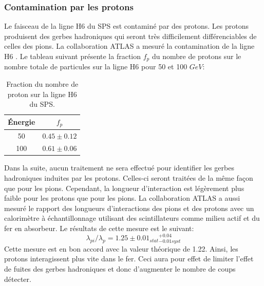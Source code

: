 \subsubsection{Contamination par les protons}
Le faisceau de la ligne H6 du SPS est contaminé par des protons. Les protons produisent des gerbes hadroniques qui seront très difficilement différenciables de celles des pions. La collaboration ATLAS a mesuré la contamination de la ligne H6 \cite{Abat}. Le tableau suivant présente la fraction $f_p$ du nombre de protons sur le nombre totale de particules sur la ligne H6 pour 50 et 100 $GeV$:
\begin{table}[!ht]
  \begin{center}
    \begin{tabular}{c|c}
      Énergie & $f_p$\\
      \hline
      50 & $0.45\pm0.12$\\
      100 & $0.61\pm0.06$\\
    \end{tabular}
  \end{center}  
  \caption{Fraction du nombre de proton sur la ligne H6 du SPS.}
  \label{tab.fp}
\end{table}
Dans la suite, aucun traitement ne sera effectué pour identifier les gerbes hadroniques induites par les protons. Celles-ci seront traitées de la même façon que pour les pions. Cependant, la longueur d’interaction est légèrement plus faible pour les protons que pour les pions. La collaboration ATLAS a aussi mesuré le rapport des longueurs d’interactions des pions et des protons avec un calorimètre à échantillonnage utilisant des scintillateurs comme milieu actif et du fer en absorbeur. Le résultats de cette mesure est le suivant:
\begin{equation}
  \lambda_{pi}/\lambda_{p}=1.25\pm0.01_{stat}{}_{-0.01syst}^{+0.04}
\end{equation}
Cette mesure est en bon accord avec la valeur théorique de 1.22. Ainsi, les protons interagissent plus vite dans le fer. Ceci aura pour effet de limiter l'effet de fuites des gerbes hadroniques et donc d'augmenter le nombre de coups détecter. 

